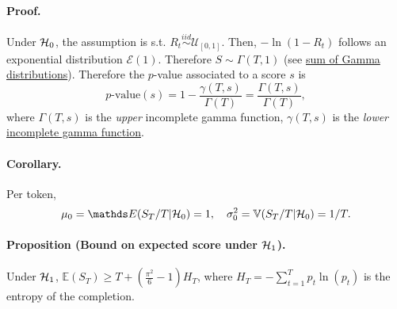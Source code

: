 \paragraph*{Proof.}
Under $\mathcal{H}_0$, the assumption is s.t. $R_t\overset{iid}{\sim}\mathcal{U}_{[0,1]}$. 
Then, $- \ln(1-R_t)$ follows an exponential distribution $\mathcal{E}(1)$.
Therefore $S\sim\Gamma(T,1)$ (see \href{https://en.wikipedia.org/wiki/Gamma_distribution#Summation}{sum of Gamma distributions}). Therefore the $p$-value associated to a score $s$ is 
\begin{equation}
    \text{$p$-value}(s) = 1 - \frac{\gamma(T,s)}{\Gamma(T)} = \frac{\Gamma(T, s)}{\Gamma(T)} ,
\end{equation}
where $\Gamma(T,s)$ is the \emph{upper} incomplete gamma function, $\gamma(T,s)$ is the \emph{lower} \href{https://en.wikipedia.org/wiki/Incomplete_gamma_function}{incomplete gamma function}. 

\paragraph*{Corollary.} Per token, 
\begin{equation}
\mu_0 = \E(S_T/T|\H_0) = 1,\quad \sigma_0^2 = \mathbb{V}(S_T/T|\H_0) = 1/T.
\end{equation}

\paragraph*{Proposition (Bound on expected score under $\mathcal{H}_1$).}
Under $\mathcal{H}_1$, 
$\displaystyle \mathbb{E}(S_T) \geq T +  \left( \frac{\pi^2}{6} -1 \right) H_T $, 
where $H_T = - \sum_{t=1}^T p_t\ln(p_t)$ is the entropy of the completion.

